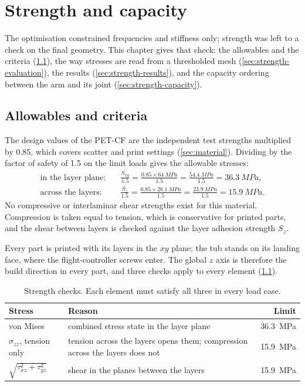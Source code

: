 \chapter{Strength and capacity}\label{sec:strength}

The optimisation constrained frequencies and stiffness only; strength was left to a check on the final geometry. This chapter gives that check: the allowables and the criteria (\cref{sec:strength-criteria}), the way stresses are read from a thresholded mesh (\cref{sec:strength-evaluation}), the results (\cref{sec:strength-results}), and the capacity ordering between the arm and its joint (\cref{sec:strength-capacity}).

\section{Allowables and criteria}\label{sec:strength-criteria}

The design values of the PET-CF are the independent test strengths multiplied by 0.85, which covers scatter and print settings (\cref{sec:material}). Dividing by the factor of safety of 1.5 on the limit loads gives the allowable stresses:
\begin{align}
\text{in the layer plane:}\quad & \frac{S_{xy}}{1.5} = \frac{0.85 \times \SI{64}{MPa}}{1.5} = \frac{\SI{54.4}{MPa}}{1.5} = \SI{36.3}{MPa},\\
\text{across the layers:}\quad & \frac{S_{z}}{1.5} = \frac{0.85 \times \SI{28.1}{MPa}}{1.5} = \frac{\SI{23.9}{MPa}}{1.5} = \SI{15.9}{MPa}.
\end{align}
No compressive or interlaminar shear strengths exist for this material. Compression is taken equal to tension, which is conservative for printed parts, and the shear between layers is checked against the layer adhesion strength $S_z$.

Every part is printed with its layers in the $xy$ plane; the tub stands on its landing face, where the flight-controller screws enter. The global $z$ axis is therefore the build direction in every part, and three checks apply to every element (\cref{tab:strength-criteria}).

\begin{table}[htbp]
\centering\small
\caption{Strength checks. Each element must satisfy all three in every load case.}\label{tab:strength-criteria}
\begin{tabularx}{\linewidth}{@{}lXr@{}}
\toprule
Stress & Reason & Limit\\
\midrule
von Mises & combined stress state in the layer plane & \SI{36.3}{MPa}\\
$\sigma_{zz}$, tension only & tension across the layers opens them; compression across the layers does not & \SI{15.9}{MPa}\\
$\sqrt{\tau_{xz}^2 + \tau_{yz}^2}$ & shear in the planes between the layers & \SI{15.9}{MPa}\\
\bottomrule
\end{tabularx}
\end{table}

